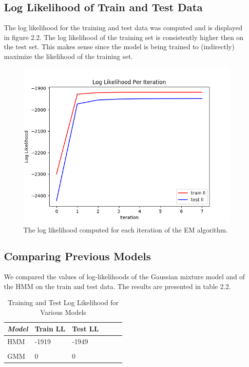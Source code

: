 \documentclass[paper=a4, fontsize=11pt]{scrartcl} %
\numberwithin{equation}{section} %
\numberwithin{figure}{section} %
\numberwithin{table}{section} %
\begin{document}
\subsection{Log Likelihood of Train and Test Data}

The log likelihood for the training and test data was computed and is displayed in figure 2.2. The log likelihood of the training set is consistently higher then on the test set. This makes sense since the model is being trained to (indirectly) maximize the likelihood of the training set.

\begin{figure}
	\includegraphics[width=.9\linewidth]{ll_Plot.png}
	\caption{The log likelihood computed for each iteration of the EM algorithm.}
\end{figure}

\newpage

\subsection{Comparing Previous Models}
We compared the values of log-likelihoods of the Gaussian mixture
model and of the HMM on the train and test data. The results are presented in table 2.2.

	\begin{table}
		\caption {Training and Test Log Likelihood for Various Models} \label{tab:title} 
		\begin{center}		
			\begin{tabular}{*6l}   
				\toprule
				\emph{Model}&  Train LL & Test LL  \\\midrule
				HMM & -1919 & -1949	\\ \\
				GMM & 0 & 0	
				\\\bottomrule
				\hline
			\end{tabular}
		\end{center}
	\end{table}
\end{document}
